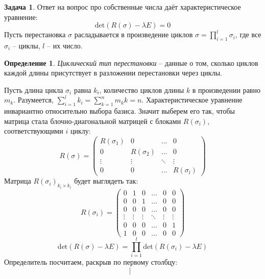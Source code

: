 \documentclass[12pt]{article}
\theoremstyle{definition}
\newtheorem{zad}{Задача}[section]
\newtheorem{defin}[theorem]{Определение}
\begin{document}
\begin{zad}
Ответ на вопрос про собственные числа даёт характеристическое уравнение:
\begin{equation}
    \text{det}(R(\sigma)-\lambda E)=0
\end{equation}
Пусть перестановка $\sigma$ расладывается в произведение циклов $\sigma=\prod\limits_{i=1}^l\sigma_i$, где все $\sigma_i$ -- циклы, $l$ -- их число.
\begin{defin}
\textit{Циклический тип перестановки} -- данные о том, сколько циклов каждой длины присутствует в разложении перестановки через циклы.
\end{defin}
Пусть длина цикла $\sigma_i$ равна $k_i$, количество циклов длины $k$ в произведении равно $m_k$. Разумеется, $\sum\limits_{i=1}^l k_i=\sum\limits_{k=1}^n m_kk=n$. Характеристическое уравнение инвариантно относительно выбора базиса. Значит выберем его так, чтобы матрица стала блочно-диагональной матрицей с блоками $R(\sigma_i)$, соответствующими $i$ циклу:
\begin{equation}
    R(\sigma)=\left(
\begin{array}{cccc}
R(\sigma_1) & 0 & \ldots & 0\\
0 & R(\sigma_2) & \ldots & 0\\
\vdots & \vdots & \ddots & \vdots\\
0 & 0 & \ldots & R(\sigma_l)
\end{array}
\right)
\end{equation}
Матрица $R(\sigma_i)_{k_i\times k_i}$ будет выглядеть так:
\begin{equation}
    R(\sigma_i)=\left(
\begin{array}{cccccc}
0 & 1 & 0 & \ldots & 0 & 0\\
0 & 0 & 1 & \ldots & 0 & 0\\
0 & 0 & 0 & \ldots & 0 & 0\\
\vdots & \vdots &\vdots & \ddots & \vdots & \vdots\\
0 & 0 & 0 & \ldots & 0 & 1\\
1 & 0 & 0 & \ldots & 0 & 0
\end{array}
\right)
\end{equation}
\begin{equation}
    \text{det}(R(\sigma)-\lambda E)=\prod_{i=1}^l\text{det}(R(\sigma_i)-\lambda E)
\end{equation}
Определитель посчитаем, раскрыв по первому столбцу:
\begin{equation}
    \left|
\begin{array}{cccccc}

\end{array}
\end{equation}
\end{zad}
\end{document}

